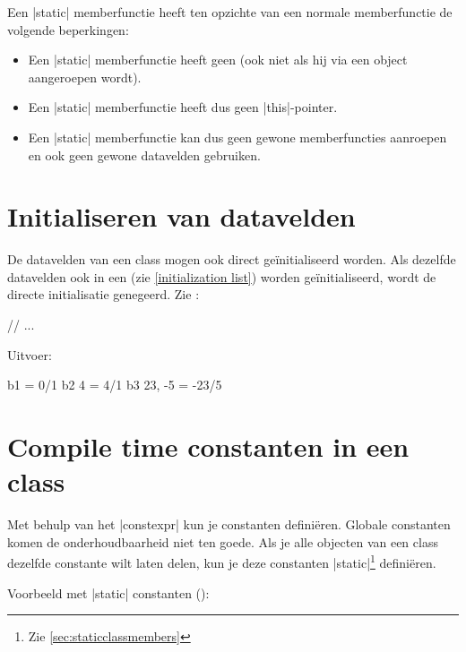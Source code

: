 \begin{cpplstShortInline}
Een |static| memberfunctie heeft ten opzichte van een normale memberfunctie de volgende beperkingen:
\begin{itemize}
    \item Een |static| memberfunctie heeft geen  (ook niet als hij via een object aangeroepen wordt).
    \item Een |static| memberfunctie heeft dus geen |this|-pointer.
    \item Een |static| memberfunctie kan dus geen gewone memberfuncties aanroepen en ook geen gewone datavelden gebruiken. 
\end{itemize}

\section{Initialiseren van datavelden}
De datavelden van een class mogen ook direct geïnitialiseerd worden. 
Als dezelfde datavelden ook in een  (zie \cref{initialization list}) worden geïnitialiseerd, wordt de directe initialisatie genegeerd.
\iftoggle{ebook}{\\}{ }%
Zie :

\begin{cpplstfragment}
//  ...
\end{cpplstfragment}
\vspace{-.8\baselineskip}

Uitvoer:
\begin{coutput}
b1 = 0/1
b2 {4} = 4/1
b3 {23, -5} = -23/5
\end{coutput}

\section{Compile time constanten in een class}
\label{sec:constexprinclass}
Met behulp van het  |constexpr| kun je  constanten definiëren.
Globale constanten komen de onderhoudbaarheid niet ten goede.
Als je alle objecten van een class dezelfde  constante wilt laten delen, kun je deze constanten |static|\footnote{Zie \cref{sec:staticclassmembers}} definiëren.

Voorbeeld met |static|  constanten ():


\end{cpplstShortInline}
